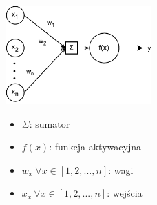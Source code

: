 \begin{figure}[H]
    \centering
    \includegraphics[width=0.5\textwidth]{images/neuron}
    \begin{itemize}
        \item[] $\Sigma$: sumator
        \item[] $f(x)$: funkcja aktywacyjna
        \item[] $w_x \  \forall x \in [1, 2, ..., n]$: wagi
        \item[] $x_x \  \forall x \in [1, 2, ..., n]$: wejścia
    \end{itemize}
    \label{fig:neuron}
\end{figure}

